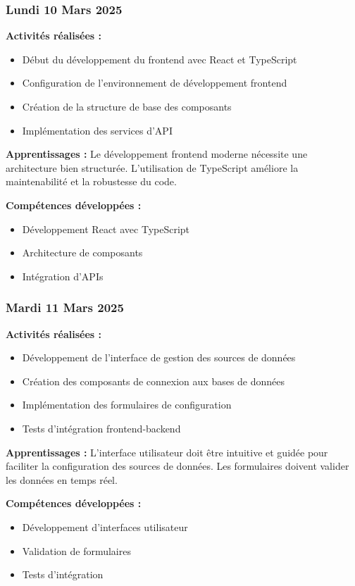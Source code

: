 \documentclass[12pt,a4paper]{article}
\begin{document}
\subsubsection{Lundi 10 Mars 2025}
\textbf{Activités réalisées :}
\begin{itemize}
    \item Début du développement du frontend avec React et TypeScript
    \item Configuration de l'environnement de développement frontend
    \item Création de la structure de base des composants
    \item Implémentation des services d'API
\end{itemize}

\textbf{Apprentissages :}
Le développement frontend moderne nécessite une architecture bien structurée. L'utilisation de TypeScript améliore la maintenabilité et la robustesse du code.

\textbf{Compétences développées :}
\begin{itemize}
    \item Développement React avec TypeScript
    \item Architecture de composants
    \item Intégration d'APIs
\end{itemize}

\subsubsection{Mardi 11 Mars 2025}
\textbf{Activités réalisées :}
\begin{itemize}
    \item Développement de l'interface de gestion des sources de données
    \item Création des composants de connexion aux bases de données
    \item Implémentation des formulaires de configuration
    \item Tests d'intégration frontend-backend
\end{itemize}

\textbf{Apprentissages :}
L'interface utilisateur doit être intuitive et guidée pour faciliter la configuration des sources de données. Les formulaires doivent valider les données en temps réel.

\textbf{Compétences développées :}
\begin{itemize}
    \item Développement d'interfaces utilisateur
    \item Validation de formulaires
    \item Tests d'intégration
\end{itemize}
\end{document}
